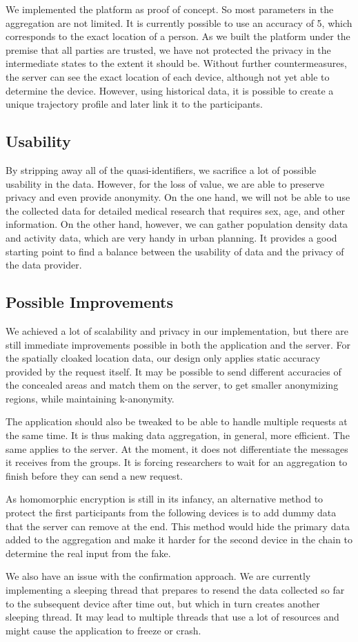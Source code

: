 We implemented the platform as proof of concept. So most parameters in the aggregation are not limited. It is currently possible to use an accuracy of 5, which corresponds to the exact location of a person. As we built the platform under the premise that all parties are trusted, we have not protected the privacy in the intermediate states to the extent it should be. Without further countermeasures, the server can see the exact location of each device, although not yet able to determine the device. However, using historical data, it is possible to create a unique trajectory profile and later link it to the participants.

\subsection{Usability}
By stripping away all of the quasi-identifiers, we sacrifice a lot of possible usability in the data. However, for the loss of value, we are able to preserve privacy and even provide anonymity. On the one hand, we will not be able to use the collected data for detailed medical research that requires sex, age, and other information. On the other hand, however, we can gather population density data and activity data, which are very handy in urban planning. It provides a good starting point to find a balance between the usability of data and the privacy of the data provider.

\subsection{Possible Improvements}
We achieved a lot of scalability and privacy in our implementation, but there are still immediate improvements possible in both the application and the server. For the spatially cloaked location data, our design only applies static accuracy provided by the request itself. It may be possible to send different accuracies of the concealed areas and match them on the server, to get smaller anonymizing regions, while maintaining k-anonymity.

The application should also be tweaked to be able to handle multiple requests at the same time. It is thus making data aggregation, in general, more efficient. The same applies to the server. At the moment, it does not differentiate the messages it receives from the groups. It is forcing researchers to wait for an aggregation to finish before they can send a new request.

As homomorphic encryption is still in its infancy, an alternative method to protect the first participants from the following devices is to add dummy data that the server can remove at the end. This method would hide the primary data added to the aggregation and make it harder for the second device in the chain to determine the real input from the fake.

We also have an issue with the confirmation approach. We are currently implementing a sleeping thread that prepares to resend the data collected so far to the subsequent device after time out, but which in turn creates another sleeping thread. It may lead to multiple threads that use a lot of resources and might cause the application to freeze or crash.

